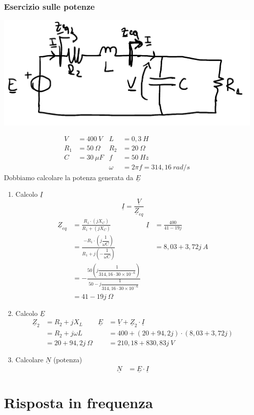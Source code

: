 \documentclass{article}
\begin{document}
\subsubsection{Esercizio sulle potenze}
\begin{center}
    \includegraphics[scale=0.3]{Image/Es_Regime_Sinusoidale_Potenze.png}
\end{center}
\begin{align*}
    V &= 400 \ V & L &= 0,3 \ H
    \\
    R_1 &= 50 \ \Omega & R_2 &= 20 \ \Omega 
    \\
    C &= 30 \ \mu F & f &= 50 \ Hz \\
    & & \omega &= 2 \pi f = 314,16 \ rad/s 
\end{align*}
Dobbiamo calcolare la potenza generata da $\underline{E}$
\begin{enumerate}
    \item Calcolo $\underline{I}$
    \[\underline{I} = \frac{\underline{V}}{\underline{Z}_{eq}}\]
    \begin{align*}
        \underline{Z}_{eq} &= \frac{R_1\cdot (jX_C)}{R_1 + (jX_C)} & 
        \underline{I} &= \frac{400}{41-19j}
        \\
        &= \frac{-R_1\cdot \left(j \dfrac{1}{\omega C}\right)}{R_1+j \left(- \dfrac{1}{\omega C}\right)} &
        &=8,03 + 3,72j \ A
        \\
        &= - \frac{50\left(j\dfrac{1}{314,16 \cdot 30 \times 10^{-6}}\right)}{50 - j\dfrac{1}{314,16 \cdot 30 \times 10^{-6}}}
        \\
        & = 41 - 19j \ \Omega
    \end{align*}
    \item Calcolo $\underline{E}$
    \begin{align*}
        \underline{Z}_2 &= R_2 +jX_L &
        \underline{E} &= \underline{V} + \underline{Z}_2 \cdot \underline{I}
        \\
        &= R_2 +j \omega L &
        &= 400 + (20 + 94,2j)\cdot (8,03+3,72j)
        \\
        &= 20 + 94,2j \ \Omega &
        &=210,18 + 830,83j \ V
    \end{align*}
    \item Calcolare $\underline{N}$ (potenza)
    \begin{align*}
        \underline{N} &= \underline{E} \cdot \underline{I}
    \end{align*}
\end{enumerate}






\section{Risposta in frequenza}
\end{document}
